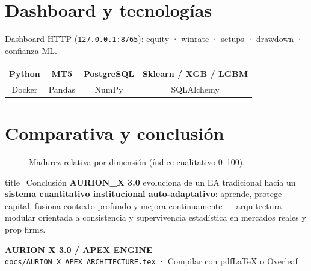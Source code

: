 \documentclass[11pt,a4paper]{article}
\begin{document}
\section{Dashboard y tecnologías}

Dashboard HTTP (\texttt{127.0.0.1:8765}): equity · winrate · setups · drawdown · confianza ML.

\begin{center}
\begin{tabular}{@{}cccc@{}}
\toprule
\textbf{Python} & \textbf{MT5} & \textbf{PostgreSQL} & \textbf{Sklearn / XGB / LGBM} \\
\midrule
Docker & Pandas & NumPy & SQLAlchemy \\
\bottomrule
\end{tabular}
\end{center}

\section{Comparativa y conclusión}

\begin{figure}[htbp]
\centering
{}
\caption{Madurez relativa por dimensión (índice cualitativo 0–100).}
\end{figure}

\begin{axcallout}{title=Conclusión}
\textbf{AURION\_X 3.0} evoluciona de un EA tradicional hacia un \textbf{sistema cuantitativo institucional auto-adaptativo}: aprende, protege capital, fusiona contexto profundo y mejora continuamente — arquitectura modular orientada a consistencia y supervivencia estadística en mercados reales y prop firms.
\end{axcallout}

\vfill
\begin{center}
\footnotesize\sffamily
\textcolor{AXNavy}{\textbf{AURION X 3.0 / APEX ENGINE}}\\
\texttt{docs/AURION\_X\_APEX\_ARCHITECTURE.tex} · Compilar con pdfLaTeX o Overleaf
\end{center}
\end{document}
